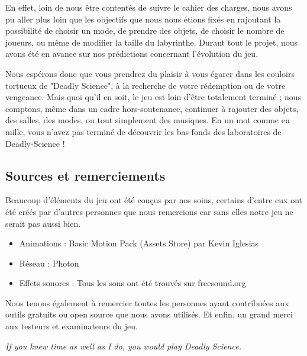 \documentclass{article}
\begin{document}
En effet, loin de nous être contentés de suivre le cahier des charges, nous avons pu aller plus loin que les objectifs que nous nous étions fixés en rajoutant la possibilité de choisir un mode, de prendre des objets, de choisir le nombre de joueurs, ou même de modifier la taille du labyrinthe. Durant tout le projet, nous avons été en avance sur nos prédictions concernant l'évolution du jeu.

Nous espérons donc que vous prendrez du plaisir à vous égarer dans les couloirs tortueux de "Deadly Science", à la recherche de votre rédemption ou de votre vengeance. Mais quoi qu'il en soit, le jeu est loin d'être totalement terminé ; nous comptons, même dans un cadre hors-soutenance, continuer à rajouter des objets, des salles, des modes, ou tout simplement des musiques. En un mot comme en mille, vous n'avez pas terminé de découvrir les bas-fonds des laboratoires de Deadly-Science !

\subsection{Sources et remerciements}

Beaucoup d'éléments du jeu ont été conçus par nos soins, certains d'entre eux ont été créés par d'autres personnes que nous remercions car sans elles notre jeu ne serait pas aussi bien.

\begin{itemize}
    \item Animations : Basic Motion Pack (Assets Store) par Kevin Iglesias
    \item Réseau : Photon
    \item Effets sonores : Tous les sons ont été trouvés sur freesound.org
\end{itemize}
    
Nous tenons également à remercier toutes les personnes ayant contribuées aux outils gratuits ou open source que nous avons utilisés.
Et enfin, un grand merci aux testeurs et examinateurs du jeu.


\newpage
\begin{center}
\emph{If you knew time as well as I do, you would play Deadly Science.}
\end{center}
\end{document}
